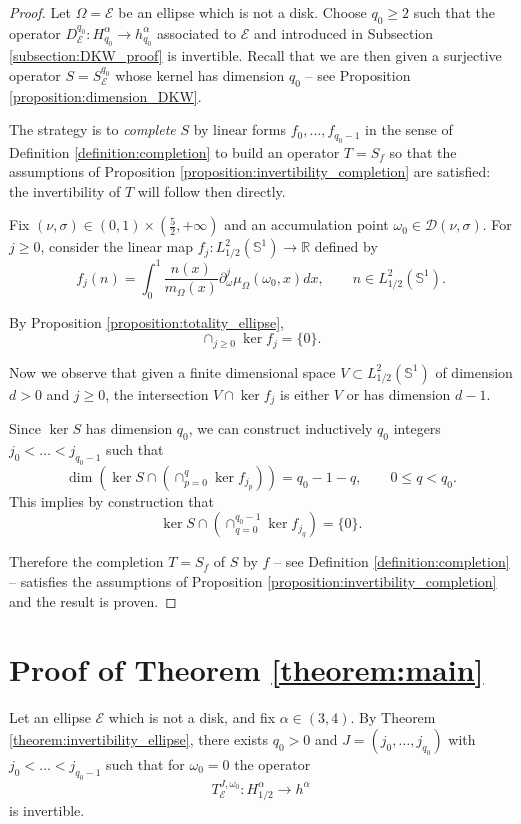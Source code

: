 \documentclass[12pt, openany]{amsart}
\theoremstyle{definition}
\theoremstyle{remark}
\theoremstyle{remark}
\theoremstyle{theorem}
\theoremstyle{theorem}
\theoremstyle{theorem}
\theoremstyle{theorem}
\newcommand{\RR}{\mathbb{R}}
\renewcommand{\SS}{\mathbb{S}}
\begin{document}
\begin{proof}
Let $\Omega=\mathscr E$ be an ellipse which is not a disk. Choose $q_0\geq 2$ such that the operator $D_{\mathscr E}^{q_0}:H^{\alpha}_{q_0}\to h^{\alpha}_{q_0}$ associated to $\mathscr E$ and introduced in Subsection \ref{subsection:DKW_proof} is invertible. Recall that we are then given a surjective operator $S=S_{\mathscr E}^{q_0}$ whose kernel has dimension $q_0$ -- see Proposition \ref{proposition:dimension_DKW}.


The strategy is to \textit{complete} $S$ by linear forms $f_0,\ldots,f_{q_0-1}$ in the sense of Definition \ref{definition:completion} to build an operator $T=S_f$ so that the assumptions of Proposition \ref{proposition:invertibility_completion} are satisfied: the invertibility of $T$ will follow then directly.


Fix $(\nu,\sigma)\in(0,1)\times(\frac{5}{2},+\infty)$ and an accumulation point $\omega_0\in\mathcal D(\nu,\sigma)$. For $j\geq 0$, consider the linear map $f_j:L^2_{1/2}(\SS^1)\to\RR$ defined by
\[
f_j(n)= \int_0^{1} \frac{n(x)}{m_{\Omega}(x)}\partial_{\omega}^{j}\mu_{\Omega}(\omega_0,x)dx,
\qquad n\in L^2_{1/2}(\SS^1).
\]

By Proposition \ref{proposition:totality_ellipse},
\[
\cap_{j\geq 0}\ker f_j = \{0\}.
\]

Now we observe that given a finite dimensional space $V\subset L^2_{1/2}(\SS^1)$ of dimension $d>0$ and $j\geq0$, the intersection $V\cap \ker f_j$ is either $V$ or has dimension $d-1$. 

Since $\ker S$ has dimension $q_0$, we can construct inductively $q_0$ integers $j_0<\ldots<j_{q_0-1}$ such that 
\[
\dim \left(\ker S\cap\left(\cap_{p=0}^q \ker f_{j_p}\right)\right) = q_0-1-q,\qquad 0\leq q<q_0.
\]
This implies by construction that 
\[
\ker S\cap\left(\cap_{q=0}^{q_0-1} \ker f_{j_q}\right) = \{0\}.
\]

Therefore the completion $T = S_f$ of $S$ by $f$ -- see Definition \ref{definition:completion} -- satisfies the assumptions of Proposition \ref{proposition:invertibility_completion} and the result is proven.
\end{proof}

\section{Proof of Theorem \ref{theorem:main}}
\label{section:proof_main}

Let an ellipse $\mathscr E$ which is not a disk, and fix $\alpha\in(3,4)$. By Theorem \ref{theorem:invertibility_ellipse}, there exists $q_0>0$ and $J=(j_0,\ldots,j_{q_0})$ with $j_0<\ldots<j_{q_0-1}$ such that for $\omega_0=0$ the operator
\[
T_{\mathscr E}^{J,\omega_0}:H^{\alpha}_{1/2} \to h^{\alpha}
\] 
is invertible. 
\end{document}
